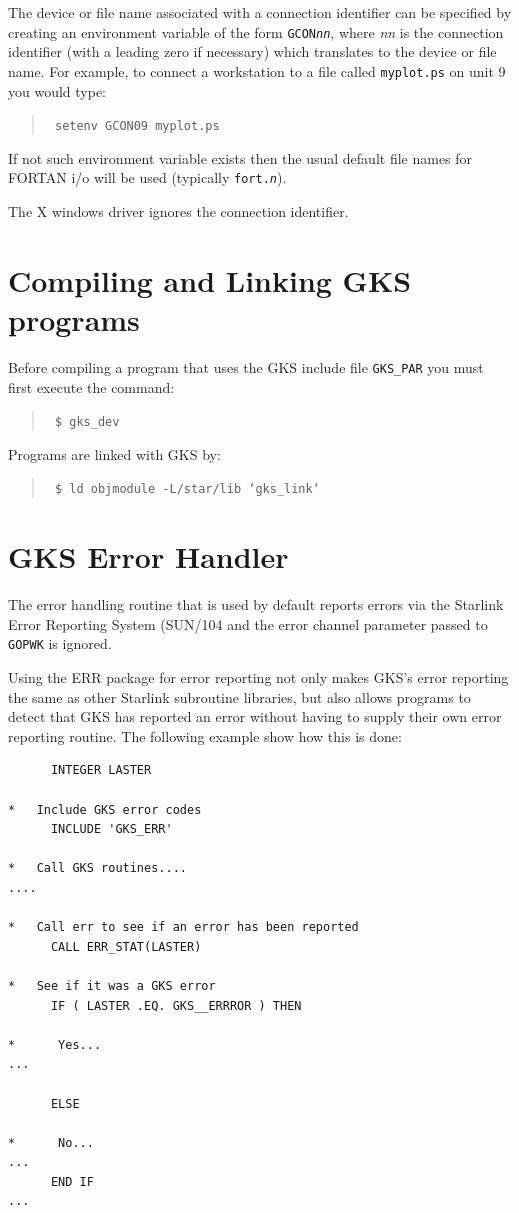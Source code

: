 \documentclass[11pt]{article}
\newcommand{\xref}[3]{#1}
\begin{document}
The device or file name associated with a connection identifier can be
specified by creating an environment variable of the form {\tt GCON{\em{nn}}},
where {\em nn} is the connection identifier (with a leading zero if 
necessary)
which translates to the device or file name.
For example, to connect a workstation to a file called {\tt myplot.ps}
on unit 9 you would type:
\begin{quote}{\tt
setenv GCON09 myplot.ps
}\end{quote}
If not such environment variable exists then the usual default file names
for FORTAN i/o will be used (typically {\tt fort.{\em{n}}}).

The X windows driver ignores the connection identifier.

\section{Compiling and Linking GKS programs}
Before compiling a program that uses the GKS include file {\tt GKS\_PAR}
you must first execute the
command:
\begin{quote}\tt
\$ gks\_dev
\end{quote}

Programs are linked with GKS by:
\begin{quote}\tt
\$ ld objmodule -L/star/lib `gks\_link`
\end{quote}

\section{GKS Error Handler}
The error handling routine that is used by default reports errors via the
Starlink Error Reporting System (\xref{SUN/104}{sun104}) and the error 
channel parameter passed to {\tt GOPWK} is ignored.

Using the ERR package for error reporting not only makes GKS's error reporting
the same as other Starlink subroutine libraries, but also allows programs
to detect that GKS has reported an error without having to supply their
own error reporting routine. The following example show how this is
done:
\begin{verbatim}
      INTEGER LASTER

*   Include GKS error codes
      INCLUDE 'GKS_ERR'

*   Call GKS routines....
....

*   Call err to see if an error has been reported
      CALL ERR_STAT(LASTER)

*   See if it was a GKS error
      IF ( LASTER .EQ. GKS__ERRROR ) THEN

*      Yes...
...

      ELSE

*      No...
...
      END IF
...
\end{verbatim}
\end{document}
